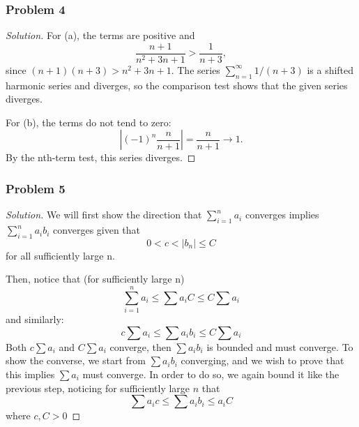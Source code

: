 \documentclass[11pt]{article}
\newcommand{\1}{\mathbf{1}}
\theoremstyle{definition}
\newenvironment{solution}{\begin{proof}[Solution]}{\end{proof}}
\begin{document}
\subsubsection*{Problem 4}
\begin{solution}
For (a), the terms are positive and
\[
\frac{n+1}{n^2+3n+1}>\frac{1}{n+3},
\]
since $(n+1)(n+3)>n^2+3n+1$. The series $\sum_{n=1}^\infty 1/(n+3)$
is a shifted harmonic series and diverges, so the comparison test shows
that the given series diverges.

\par For (b), the terms do not tend to zero:
\[
\left|(-1)^n\frac{n}{n+1}\right|=\frac{n}{n+1}\longrightarrow 1.
\]
By the nth-term test, this series diverges.
\end{solution}
\subsubsection*{Problem 5}
\begin{solution}
    We will first show the direction that $\sum_{i=1}^{n} a_i$ converges implies
    $\sum_{i=1}^{n} a_ib_i$ converges given that $$0 < c < |b_n| \le C$$ for all sufficiently
    large  n.
\par    Then, notice that (for sufficiently large n)
    $$\sum_{i = 1}^{n}a_i \le \sum a_i C \le C \sum a_i$$ and similarly:
        $$c\sum a_i \le \sum a_i b_i \le C\sum a_i$$
    Both $c\sum
    a_i$  and $C \sum a_i$ converge, then $\sum a_ib_i$ is bounded and must converge. 
    To show the converse, we start from $\sum a_i b_i$ converging, and we wish to prove
    that this implies $\sum a_i$ must converge.
    In order to do so, we again bound it like the previous step, noticing for
    sufficiently large $n$ that 
    $$\sum a_i c \le \sum a_i b_i \le a_iC$$
        where $c, C>0$

\end{solution}
\end{document}
